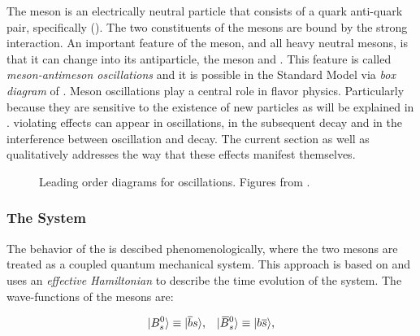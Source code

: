The \Bs meson is an electrically neutral particle that consists of a quark anti-quark pair, specifically (\bquarkbar\squark).
The two constituents of the mesons are bound by the strong interaction. An important feature of
the \Bs meson, and all heavy neutral mesons, is that it can change into its antiparticle,
the \Bsb meson and \viceversa. This feature is called {\it meson-antimeson oscillations} and it is possible
in the Standard Model via  {\it box diagram} of .
Meson oscillations play a central role in flavor physics. Particularly because they are sensitive to the
existence of new particles as will be explained in . \CP violating effects can
appear in \BBbarSyst oscillations, in the subsequent decay and in the interference between oscillation
and decay. The current section as well as  qualitatively addresses the way that
these effects manifest themselves.

\begin{figure}[!h]
  \centering
  \begin{subfigure}{0.5\textwidth}
    \centering
    \raggedright
    \scalebox{0.9}{\sffamily }
    \caption{}
    \label{bs_box_1}
  \end{subfigure}%
  \hfill%
  \begin{subfigure}{0.5\textwidth}
    \centering
    \raggedleft
    \scalebox{0.9}{\sffamily }
    \caption{}
    \label{bs_box_2}
  \end{subfigure}
  \caption{Leading order diagrams for \BBbarSyst oscillations. Figures from \cite{jeroenThesis}.}
  \label{bs_box}
\end{figure}

\subsubsection{The \BBbarSyst System}
\label{the_bbar_system}

The behavior of the \BBbarSyst is descibed phenomenologically, where the two mesons are treated as a
coupled quantum mechanical system. This approach
is based on \cite{Weisskopf:1930au,Weisskopf:1930ps} and uses an {\it effective Hamiltonian}
\cite{eff-hamiltonian-bs-syst,DeBruyn-thesis} to describe the time evolution of the system.
The wave-functions of the mesons are:

\begin{equation}
  \centering
  \ket{\Bs}  \equiv  \ket{\bquarkbar\squark}, \;\;\; \ket{\Bsb} \equiv  \ket{\bquark\squarkbar},
  \label{bs_wavefunctions}
\end{equation}

